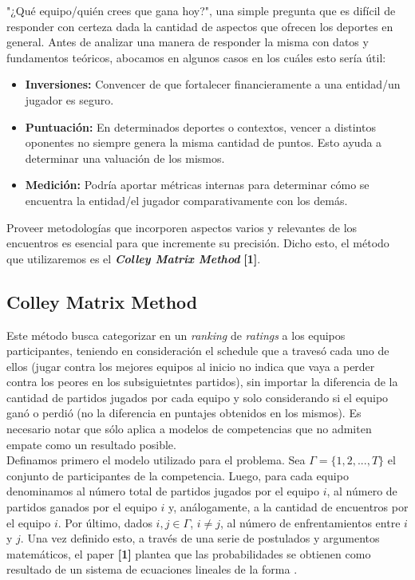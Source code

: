 "¿Qu\'e equipo/qui\'en crees que gana hoy?", una simple pregunta que es dif\'icil de responder con certeza dada la cantidad de aspectos que ofrecen los deportes en general. Antes de analizar una manera de responder la misma con datos y fundamentos te\'oricos, abocamos en algunos casos en los cuáles esto ser\'ia \'util:

\begin{itemize}
\item \textbf{Inversiones:} Convencer de que fortalecer financieramente a una entidad/un jugador es seguro.
\item \textbf{Puntuaci\'on:} En determinados deportes o contextos, vencer a distintos oponentes no siempre genera la misma cantidad de puntos. Esto ayuda a determinar una valuaci\'on de los mismos.
\item \textbf{Medici\'on:} Podr\'ia aportar m\'etricas internas para determinar c\'omo se encuentra la entidad/el jugador comparativamente con los dem\'as.
\end{itemize}

Proveer metodolog\'ias que incorporen aspectos varios y relevantes de los encuentros es esencial para que incremente su precisión. Dicho esto, el m\'etodo que utilizaremos es el \textbf{\textit{Colley Matrix Method}} \textbf{[1]}.

\subsection{Colley Matrix Method}

Este m\'etodo busca categorizar en un \textit{ranking} de \textit{ratings} a los equipos participantes, teniendo en consideraci\'on el schedule que a traves\'o cada uno de ellos (jugar contra los mejores equipos al inicio no indica que vaya a perder contra los peores en los subsiguietntes partidos), sin importar la diferencia de la cantidad de partidos jugados por cada equipo y solo considerando si el equipo gan\'o o perdi\'o (no la diferencia en puntajes obtenidos en los mismos). Es necesario notar que s\'olo aplica a modelos de competencias que no admiten empate como un resultado posible. \\

Definamos primero el modelo utilizado para el problema. Sea $\Gamma = \{1,2,...,T\}$ el conjunto de participantes de la competencia. Luego, para cada equipo  denominamos  al n\'umero total de partidos jugados por el equipo $i$,  al n\'umero de partidos ganados por el equipo $i$ y, an\'alogamente,  a la cantidad de encuentros por el equipo $i$. Por \'ultimo, dados $i, j \in \Gamma$, $i \neq j$,  al n\'umero de enfrentamientos entre $i$ y $j$. Una vez definido esto, a través de una serie de postulados y argumentos matemáticos, el paper \textbf{[1]} plantea que las probabilidades se obtienen como resultado de un sistema de ecuaciones lineales de la forma . \\

